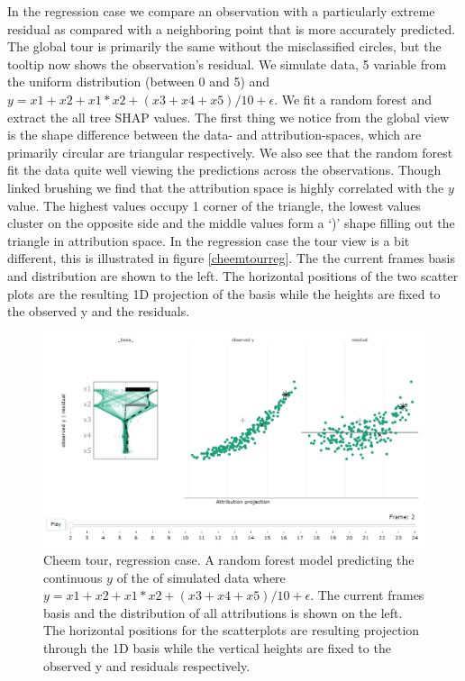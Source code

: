 \documentclass[
]{article}
\begin{document}
In the regression case we compare an observation with a particularly extreme residual as compared with a neighboring point that is more accurately predicted. The global tour is primarily the same without the misclassified circles, but the tooltip now shows the observation's residual. We simulate data, 5 variable from the uniform distribution (between 0 and 5) and \(y = x1 + x2 + x1*x2 + (x3 + x4 + x5) / 10 + \epsilon\). We fit a random forest and extract the all tree SHAP values. The first thing we notice from the global view is the shape difference between the data- and attribution-spaces, which are primarily circular are triangular respectively. We also see that the random forest fit the data quite well viewing the predictions across the observations. Though linked brushing we find that the attribution space is highly correlated with the \(y\) value. The highest values occupy 1 corner of the triangle, the lowest values cluster on the opposite side and the middle values form a `)' shape filling out the triangle in attribution space. In the regression case the tour view is a bit different, this is illustrated in figure \ref{cheemtourreg}. The the current frames basis and distribution are shown to the left. The horizontal positions of the two scatter plots are the resulting 1D projection of the basis while the heights are fixed to the observed y and the residuals.



\begin{figure}

{\centering \includegraphics[width=1\linewidth]{./figures/cheem_tour_toy_reg} 

}

\caption{Cheem tour, regression case. A random forest model predicting the continuous \(y\) of the of simulated data where \(y = x1 + x2 + x1*x2 + (x3 + x4 + x5) / 10 + \epsilon\). The current frames basis and the distribution of all attributions is shown on the left. The horizontal positions for the scatterplots are resulting projection through the 1D basis while the vertical heights are fixed to the observed y and residuals respectively.}\label{fig:cheemtourreg}
\end{figure}
\end{document}
